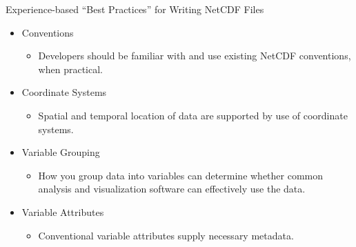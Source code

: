 \documentclass[compress,11pt,xcolor=svgnames,aspectratio=169]{beamer}
\begin{document}
\begin{frame}[t]{Experience-based ``Best Practices'' for Writing NetCDF Files}

    \begin{itemize}
    \setlength\itemsep{0.3cm}

        \item	Conventions
        \begin{itemize}
          \item Developers should be familiar with and use existing NetCDF conventions, when practical.
        \end{itemize}

        \item	Coordinate Systems
        \begin{itemize}
          \item Spatial and temporal location of data are supported by use of coordinate systems.
        \end{itemize}

        \item	Variable Grouping
        \begin{itemize}
          \item How you group data into variables can determine whether common analysis and visualization software can effectively use the data.
        \end{itemize}

        \item	Variable Attributes
        \begin{itemize}
          \item Conventional variable attributes supply necessary metadata.
        \end{itemize}

    \end{itemize}

\end{frame}
\end{document}
